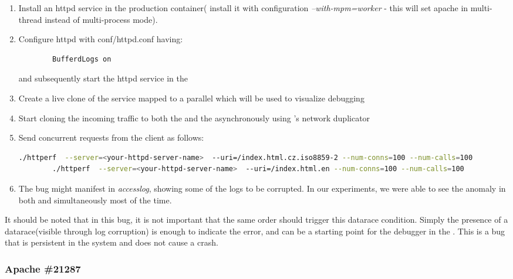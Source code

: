 \begin{adjustwidth}{0.5cm}{}
	\begin{enumerate}
		\item Install an httpd service in the production container( install it with configuration \emph{--with-mpm=worker} - this will set apache in multi-thread instead of multi-process mode).
		\item Configure httpd with conf/httpd.conf having:
		
		\begin{lstlisting}
		BufferdLogs on
		\end{lstlisting}
		
		and subsequently start the httpd service in the \productioncontainer
		
		\item Create a live clone of the service mapped to a parallel \debugcontainer which will be used to visualize debugging
		\item Start cloning the incoming traffic to both the \productioncontainer and the \debugcontainer asynchronously using \parikshan's network duplicator
		
		\item Send concurrent requests from the client as follows:
		
		\begin{lstlisting}[language=sh]
		./httperf  --server=<your-httpd-server-name>  --uri=/index.html.cz.iso8859-2 --num-conns=100 --num-calls=100
		./httperf  --server=<your-httpd-server-name>  --uri=/index.html.en --num-conns=100 --num-calls=100
		\end{lstlisting}
		
		\item The bug might manifest in \emph{accesslog}, showing some of the logs to be corrupted. In our experiments, we were able to see the anomaly in both \productioncontainer and \debugcontainer simultaneously most of the time.
		
	\end{enumerate}
\end{adjustwidth}

It should be noted that in this bug, it is not important that the same order should trigger this datarace condition. Simply the presence of a datarace(visible through log corruption) is enough to indicate the error, and can be a starting point for the debugger in the \debugcontainer. This is a bug that is persistent in the system and does not cause a crash.

\subsubsection{Apache \#21287}

